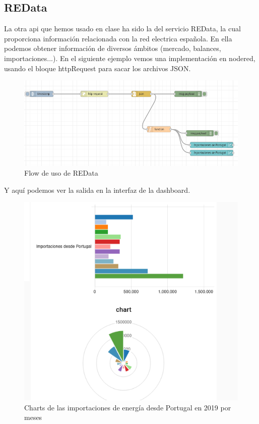 \documentclass[12pt]{article}
\begin{document}
\subsection{REData}

La otra api que hemos usado en clase ha sido la del servicio REData, la cual proporciona 
información relacionada con la red electrica española. En ella podemos obtener información de diversos 
ámbitos (mercado, balances, importaciones...). En el siguiente ejemplo vemos una  implementación en nodered, usando el bloque httpRequest
para sacar los archivos JSON. \\

\begin{figure}[H]
    \centering
    \includegraphics[scale=0.4]{noderedportugal.png}
    \caption{Flow de uso de REData}
    \label{nodeport}
\end{figure}

Y aquí podemos ver la salida en la interfaz de la dashboard.


\begin{figure}[H]
    \centering
    \includegraphics[scale=0.4]{graficasportugal.png}
    \caption{Charts de las importaciones de energía desde Portugal en 2019 por meses}
    \label{grafport}
\end{figure}
\end{document}

